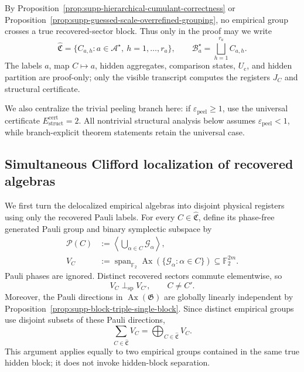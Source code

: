\documentclass[
  aps,
  prx,
  reprint,
  superscriptaddress,
  amsmath,
  amssymb,
  nofootinbib,
  longbibliography
]{revtex4-2}
\newcommand{\Span}{\operatorname{span}}
\newcommand{\Fc}{\mathbb{F}_2}
\begin{document}
By Proposition~\ref{prop:supp-hierarchical-cumulant-correctness} or
Proposition~\ref{prop:supp-guessed-scale-overrefined-grouping}, no empirical
group crosses a true recovered-sector block.  Thus only in the proof may we
write
\begin{equation}
\widehat{\mathfrak C}
=
\{C_{a,h}:a\in\mathcal A^\star,\ h=1,\dots,r_a\},
\qquad
\mathcal B_a^\star
=
\bigsqcup_{h=1}^{r_a}C_{a,h}.
\label{eq:supp-localization-hidden-refinement}
\end{equation}
The labels $a$, map $C\mapsto a$, hidden aggregates, comparison states,
$U_{\mathrm c}$, and hidden partition are proof-only; only the visible
transcript computes the registers $J_C$ and structural certificate.

We also centralize the trivial peeling branch here: if
$\varepsilon_{\mathrm{peel}}\ge1$, use the universal certificate
$E_{\mathrm{struct}}^{\mathrm{cert}}=2$.  All nontrivial structural analysis
below assumes $\varepsilon_{\mathrm{peel}}<1$, while branch-explicit theorem
statements retain the universal case.

\subsection{Simultaneous Clifford localization of recovered algebras}
\label{sec:supp-simultaneous-clifford-localization}

We first turn the delocalized empirical algebras into disjoint physical
registers using only the recovered Pauli labels.
For every $C\in\widehat{\mathfrak C}$, define its phase-free generated
Pauli group and binary symplectic subspace by
\begin{equation}
\begin{aligned}
\mathcal P(C)
&:=
\left\langle\bigcup_{\alpha\in C}\mathcal G_\alpha\right\rangle,
\\
V_C
&:=
\Span_{\Fc}
\operatorname{Ax}\!\left(\{\mathcal G_\alpha:\alpha\in C\}\right)
\subseteq\Fc^{2m}.
\end{aligned}
\label{eq:supp-empirical-group-algebras}
\end{equation}
Pauli phases are ignored.  Distinct recovered sectors commute elementwise, so
\begin{equation}
V_C\perp_{\mathrm{sp}}V_{C'},
\qquad C\ne C'.
\label{eq:supp-empirical-group-symplectic-orthogonality}
\end{equation}
Moreover, the Pauli directions in $\operatorname{Ax}(\mathfrak G)$ are globally
linearly independent by
Proposition~\ref{prop:supp-block-triple-single-block}.  Since distinct
empirical groups use disjoint subsets of these Pauli directions,
\begin{equation}
\sum_{C\in\widehat{\mathfrak C}}V_C
=
\bigoplus_{C\in\widehat{\mathfrak C}}V_C.
\label{eq:supp-empirical-group-direct-sum}
\end{equation}
This argument applies equally to two empirical groups contained in the same
true hidden block; it does not invoke hidden-block separation.
\end{document}
